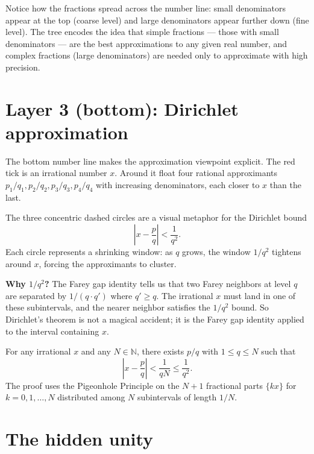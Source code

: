 \medskip

Notice how the fractions spread across the number line: small
denominators appear at the top (coarse level) and large denominators
appear further down (fine level).
The tree encodes the idea that simple fractions --- those with small
denominators --- are the best approximations to any given real number,
and complex fractions (large denominators) are needed only to
approximate with high precision.

\bigskip

\section*{Layer 3 (bottom): Dirichlet approximation}

The bottom number line makes the approximation viewpoint explicit.
The red tick is an irrational number $x$.
Around it float four rational approximants $p_1/q_1, p_2/q_2,
p_3/q_3, p_4/q_4$ with increasing denominators, each closer to $x$
than the last.

\medskip

The three concentric dashed circles are a visual metaphor for
the Dirichlet bound
\[
\left| x - \frac{p}{q} \right| < \frac{1}{q^2}.
\]
Each circle represents a shrinking window: as $q$ grows, the window
$1/q^2$ tightens around $x$, forcing the approximants to cluster.

\medskip

\textbf{Why $1/q^2$?}
The Farey gap identity tells us that two Farey neighbors at level $q$
are separated by $1/(q \cdot q')$ where $q' \geq q$.
The irrational $x$ must land in one of these subintervals, and the
nearer neighbor satisfies the $1/q^2$ bound.
So Dirichlet's theorem is not a magical accident; it is the Farey gap
identity applied to the interval containing $x$.

\medskip

\begin{remark*}
For any irrational $x$ and any $N \in \mathbb{N}$, there exists
$p/q$ with $1 \leq q \leq N$ such that
\[
\left| x - \frac{p}{q} \right| < \frac{1}{qN} \leq \frac{1}{q^2}.
\]
The proof uses the Pigeonhole Principle on the $N+1$ fractional parts
$\{kx\}$ for $k = 0, 1, \ldots, N$ distributed among $N$ subintervals
of length $1/N$.
\end{remark*}

\bigskip

\section*{The hidden unity}


